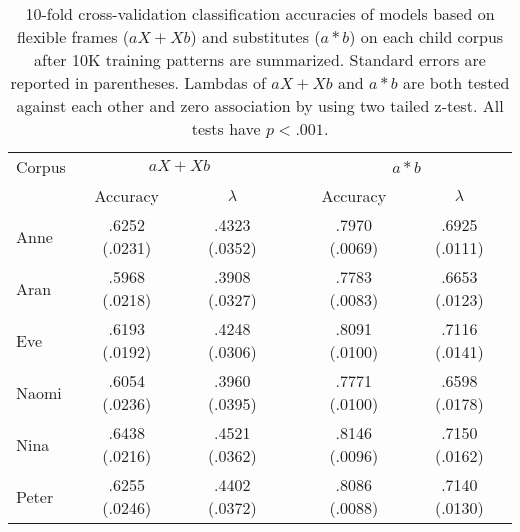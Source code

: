 \begin{table}[ht]
  \small 
  \centering
  \caption{10-fold cross-validation classification accuracies of models based
    on flexible frames ($aX + Xb$) and substitutes ($a*b$) on each child corpus
    after 10K training patterns are summarized.  Standard errors are reported
    in parentheses.  Lambdas of $aX+Xb$ and $a*b$ are both tested against each
    other and zero association by using two tailed z-test.  All tests have
    $p<.001$.}
\begin{tabular}{lccccc}
    \hline
    Corpus & \multicolumn{2}{c}{$aX+Xb$} && \multicolumn{2}{c}{$a*b$} \\
    \cline{2-3}
    \cline{5-6}
    & Accuracy & $\lambda$ && Accuracy & $\lambda$\\
    \hline
    \hline
    Anne  & .6252 (.0231) & .4323 (.0352) && .7970 (.0069) & .6925 (.0111)\\
    Aran  & .5968 (.0218) & .3908 (.0327) && .7783 (.0083) & .6653 (.0123)\\
    Eve   & .6193 (.0192) & .4248 (.0306) && .8091 (.0100) & .7116 (.0141)\\
    Naomi & .6054 (.0236) & .3960 (.0395) && .7771 (.0100) & .6598 (.0178)\\
    Nina  & .6438 (.0216) & .4521 (.0362) && .8146 (.0096) & .7150 (.0162)\\
    Peter & .6255 (.0246) & .4402 (.0372) && .8086 (.0088) & .7140 (.0130)\\
    \hline
  \end{tabular}
  \label{t:framevssub10K}
\end{table}

